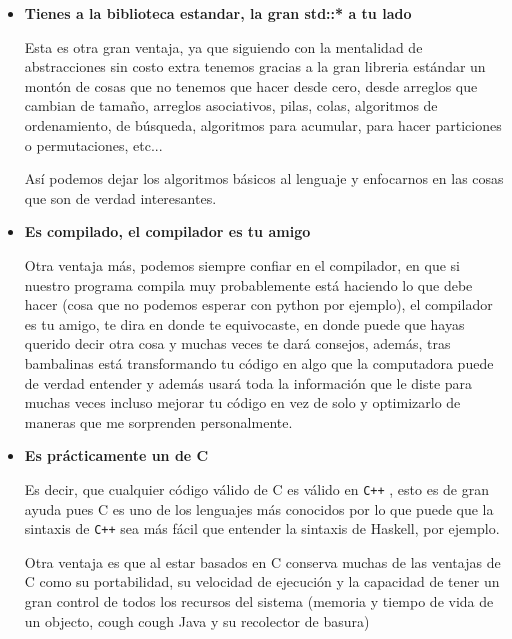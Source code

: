 \documentclass[12pt, fleqn]{report}                             %
\newcommand \Quote              {\qq}                           %
\theoremstyle{break}                                            %
\newcommand \Cpp  {\texttt{C++} }                               %
\begin{document}
\begin{itemize}
                \item \textbf{Tienes a la biblioteca estandar, la gran std::* a tu lado}

                    Esta es otra gran ventaja, ya que siguiendo con la mentalidad de abstracciones sin costo extra tenemos
                    gracias a la gran libreria estándar un montón de cosas que no tenemos que hacer desde cero, desde
                    arreglos que cambian de tamaño, arreglos asociativos, pilas, colas, algoritmos de ordenamiento, 
                    de búsqueda, algoritmos para acumular, para hacer particiones o permutaciones, etc...

                    Así podemos dejar los algoritmos básicos al lenguaje y enfocarnos en las cosas que son de verdad interesantes.


                \item \textbf{Es compilado, el compilador es tu amigo}

                    Otra ventaja más, podemos siempre confiar en el compilador, en que si nuestro programa compila muy probablemente
                    está haciendo lo que debe hacer (cosa que no podemos esperar con python por ejemplo), el compilador es tu amigo,
                    te dira en donde te equivocaste, en donde puede que hayas querido decir otra cosa y muchas veces te dará
                    consejos, además, tras bambalinas está transformando tu código en algo que la computadora puede de verdad
                    entender y además usará toda la información que le diste para muchas veces incluso mejorar tu código en vez
                    de solo \Quote{traducirlo} y optimizarlo de maneras que me sorprenden personalmente.


                \item \textbf{Es prácticamente un \Quote{super set} de C}
                
                    Es decir, que
                    cualquier código válido de C es válido en \Cpp, esto es de gran ayuda pues
                    C es uno de los lenguajes más conocidos por lo que puede que la sintaxis de \Cpp sea
                    más fácil que entender la sintaxis de Haskell, por ejemplo. 
                    
                    Otra ventaja es que al estar basados
                    en C conserva muchas de las ventajas de C como su portabilidad, su velocidad de ejecución
                    y la capacidad de tener un gran control de todos los recursos del sistema (memoria y tiempo
                    de vida de un objecto, cough cough Java y su recolector de basura)


\end{itemize}
\end{document}
